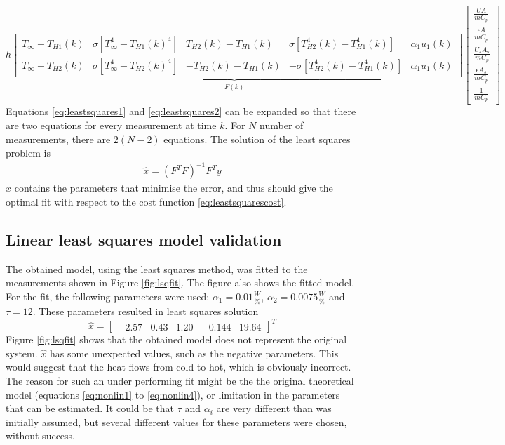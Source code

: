 \begin{equation}
        \underbrace{h\begin{bmatrix}
        T_{\infty} - T_{H1}(k) & \sigma[T_{\infty}^4 - T_{H1}(k)^4] & T_{H2}(k) - T_{H1}(k) & \sigma[T_{H2}^4(k) - T_{H1}^4(k)] & \alpha_1 u_1(k)\\
        T_{\infty} - T_{H2}(k) & \sigma[T_{\infty}^4 - T_{H2}(k)^4] & -T_{H2}(k) - T_{H1}(k) & -\sigma[T_{H2}^4(k) - T_{H1}^4(k)] & \alpha_1 u_1(k)       
    \end{bmatrix}}_{F(k)}
    \begin{bmatrix}
    \frac{UA}{mC_p} \\ \frac{\epsilon A}{mC_p} \\ \frac{U_sA_s}{mC_p} \\ \frac{\epsilon A_s}{mC_p} \\ \frac{1}{mC_p} \label{eq:leastsquares2}
    \end{bmatrix}
\end{equation}
Equations \ref{eq:leastsquares1} and \ref{eq:leastsquares2} can be expanded so that there are two equations for every measurement at time $k$. For $N$ number of measurements, there are $2(N-2)$ equations. The solution of the least squares problem is \cite[p.~28--32]{FilteringIdentification}
\begin{align}
    \hat{x} = (F^TF)^{-1}F^Ty
\end{align}
$\hat{x}$ contains the parameters that minimise the error, and thus should give the optimal fit with respect to the cost function \ref{eq:leastsquarescost}.

\subsection{Linear least squares model validation}
The obtained model, using the least squares method, was fitted to the measurements shown in Figure \ref{fig:lsqfit}. The figure also shows the fitted model. For the fit, the following parameters were used: $\alpha_1 = 0.01 \frac{W}{\%}$, $\alpha_2 = 0.0075 \frac{W}{\%}$ and $\tau = 12$. These parameters resulted in least squares solution
$$
    \hat{x} = \begin{bmatrix} -2.57 & 0.43 & 1.20 & -0.144 & 19.64\end{bmatrix}^T
$$
Figure \ref{fig:lsqfit} shows that the obtained model does not represent the original system. $\hat{x}$ has some unexpected values, such as the negative parameters. This would suggest that the heat flows from cold to hot, which is obviously incorrect. The reason for such an under performing fit might be the the original theoretical model (equations \ref{eq:nonlin1} to \ref{eq:nonlin4}), or limitation in the parameters that can be estimated. It could be that $\tau$ and $\alpha_i$ are very different than was initially assumed, but several different values for these parameters were chosen, without success.

